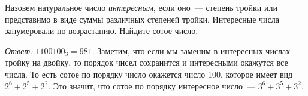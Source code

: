 \problem
Назовем натуральное число \emph{интересным}, если оно~--- степень тройки или
представимо в виде суммы различных степеней тройки.
Интересные числа занумеровали по возрастанию.
Найдите сотое число.

\solution
\emph{Ответ:} $1100100_3 = 981$.
Заметим, что если мы заменим в интересных числах тройку на двойку, то порядок
чисел сохранится и интересными окажутся все числа.
То есть сотое по порядку число окажется число 100, которое имеет вид
$2^{6} + 2^{5} + 2^{2}$.
Это значит, что сотое по порядку интересное число~--- $3^6 + 3^5 + 3^2$.
\endproblem
